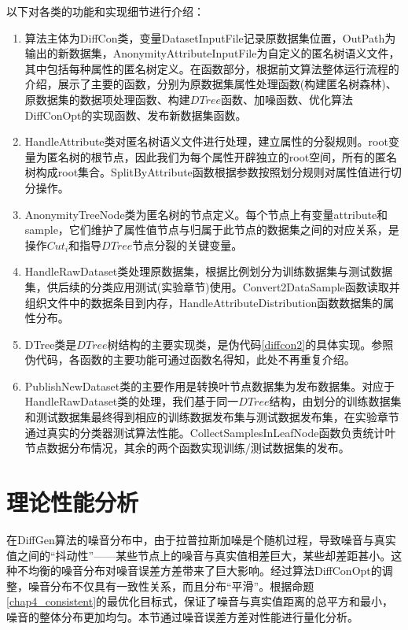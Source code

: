 以下对各类的功能和实现细节进行介绍：
\begin{enumerate}
	\item 算法主体为DiffCon类，变量DatasetInputFile记录原数据集位置，OutPath为输出的新数据集，AnonymityAttributeInputFile为自定义的匿名树语义文件，其中包括每种属性的匿名树定义。在函数部分，根据前文算法整体运行流程的介绍，展示了主要的函数，分别为原数据集属性处理函数(构建匿名树森林)、原数据集的数据项处理函数、构建$DTree$函数、加噪函数、优化算法DiffConOpt的实现函数、发布新数据集函数。
	\item HandleAttribute类对匿名树语义文件进行处理，建立属性的分裂规则。root变量为匿名树的根节点，因此我们为每个属性开辟独立的root空间，所有的匿名树构成root集合。SplitByAttribute函数根据参数按照划分规则对属性值进行切分操作。
	\item AnonymityTreeNode类为匿名树的节点定义。每个节点上有变量attribute和sample，它们维护了属性值节点与归属于此节点的数据集之间的对应关系，是操作$Cut_{i}$和指导$DTree$节点分裂的关键变量。
	\item HandleRawDataset类处理原数据集，根据比例划分为训练数据集与测试数据集，供后续的分类应用测试(实验章节)使用。Convert2DataSample函数读取并组织文件中的数据条目到内存，HandleAttributeDistribution函数数据集的属性分布。
	\item DTree类是$DTree$树结构的主要实现类，是伪代码\ref{diffcon2}的具体实现。参照伪代码，各函数的主要功能可通过函数名得知，此处不再重复介绍。
	\item PublishNewDataset类的主要作用是转换叶节点数据集为发布数据集。对应于HandleRawDataset类的处理，我们基于同一$DTree$结构，由划分的训练数据集和测试数据集最终得到相应的训练数据发布集与测试数据发布集，在实验章节通过真实的分类器测试算法性能。CollectSamplesInLeafNode函数负责统计叶节点数据分布情况，其余的两个函数实现训练/测试数据集的发布。
\end{enumerate}

\section{理论性能分析}
\label{theory analysis}

在DiffGen算法的噪音分布中，由于拉普拉斯加噪是个随机过程，导致噪音与真实值之间的“抖动性”——某些节点上的噪音与真实值相差巨大，某些却差距甚小。这种不均衡的噪音分布对噪音误差方差带来了巨大影响。经过算法DiffConOpt的调整，噪音分布不仅具有一致性关系，而且分布“平滑”。根据命题\ref{chap4_consistent}的最优化目标式，保证了噪音与真实值距离的总平方和最小，噪音的整体分布更加均匀。本节通过噪音误差方差对性能进行量化分析。

